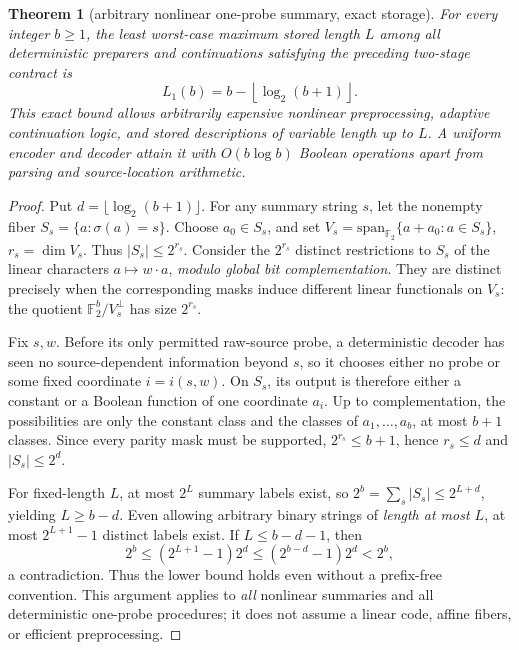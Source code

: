 \documentclass[10pt]{article}
\newtheorem{theorem}{Theorem}
\newcommand{\F}{\mathbb F_2}
\begin{document}
\begin{theorem}[arbitrary nonlinear one-probe summary, exact storage]\label{th:main}
For every integer $b\ge1$, the least worst-case maximum stored length $L$ among all deterministic preparers and continuations satisfying the preceding two-stage contract is
\[
\boxed{L_1(b)=b-\left\lfloor\log_2(b+1)\right\rfloor.}
\]
This exact bound allows arbitrarily expensive nonlinear preprocessing, adaptive continuation logic, and stored descriptions of variable length up to $L$. A uniform encoder and decoder attain it with $O(b\log b)$ Boolean operations apart from parsing and source-location arithmetic.
\end{theorem}
\begin{proof}
Put $d=\lfloor\log_2(b+1)\rfloor$. For any summary string $s$, let the nonempty fiber $S_s=\{a:\sigma(a)=s\}$. Choose $a_0\in S_s$, and set $V_s=\mathrm{span}_{\F}\{a+a_0:a\in S_s\}$, $r_s=\dim V_s$. Thus $|S_s|\le 2^{r_s}$. Consider the $2^{r_s}$ distinct restrictions to $S_s$ of the linear characters $a\mapsto w\cdot a$, \emph{modulo global bit complementation}. They are distinct precisely when the corresponding masks induce different linear functionals on $V_s$: the quotient $\F^b/V_s^\perp$ has size $2^{r_s}$.

Fix $s,w$. Before its only permitted raw-source probe, a deterministic decoder has seen no source-dependent information beyond $s$, so it chooses either no probe or some fixed coordinate $i=i(s,w)$. On $S_s$, its output is therefore either a constant or a Boolean function of one coordinate $a_i$. Up to complementation, the possibilities are only the constant class and the classes of $a_1,\dots,a_b$, at most $b+1$ classes. Since every parity mask must be supported, $2^{r_s}\le b+1$, hence $r_s\le d$ and $|S_s|\le 2^d$.

For fixed-length $L$, at most $2^L$ summary labels exist, so $2^b=\sum_s|S_s|\le2^{L+d}$, yielding $L\ge b-d$. Even allowing arbitrary binary strings of \emph{length at most $L$}, at most $2^{L+1}-1$ distinct labels exist. If $L\le b-d-1$, then
\[
2^b\le(2^{L+1}-1)2^d\le(2^{b-d}-1)2^d<2^b,
\]
a contradiction. Thus the lower bound holds even without a prefix-free convention. This argument applies to \emph{all} nonlinear summaries and all deterministic one-probe procedures; it does not assume a linear code, affine fibers, or efficient preprocessing.


\end{proof}
\end{document}
